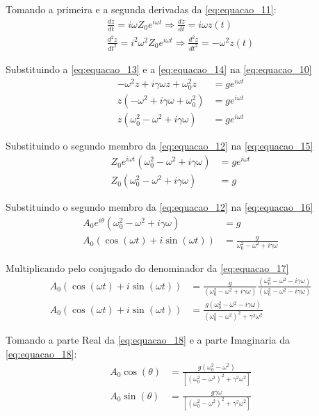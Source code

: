\documentclass[12pt]{article}
\begin{document}
		Tomando a primeira e a segunda derivadas da \autoref{eq:equacao_11}:
		\begin{align}
			\frac{dz}{dt} = i\omega Z_0e^{i\omega t} \Longrightarrow \frac{dz}{dt} = i\omega z(t) \label{eq:equacao_13} \\
			\frac{d^2z}{dt^2} = i^2\omega^2 Z_0e^{i\omega t} \Longrightarrow \frac{d^2z}{dt^2} = -\omega^2 z(t) \label{eq:equacao_14}
		\end{align}
		
		Substituindo a \autoref{eq:equacao_13} e a \autoref{eq:equacao_14} na \autoref{eq:equacao_10}
		\begin{align}
			-\omega^2z + i\gamma \omega z + \omega_0^2 z &= ge^{i\omega t} \nonumber \\
			z(-\omega^2 + i\gamma \omega + \omega_0^2) &= ge^{i\omega t} \nonumber \\
			z(\omega_0^2-\omega^2 + i\gamma \omega) &= ge^{i\omega t} \label{eq:equacao_15}
		\end{align}
		
		Substituindo o segundo membro da \autoref{eq:equacao_12} na \autoref{eq:equacao_15}
		\begin{align}
			Z_0e^{i\omega t}(\omega_0^2-\omega^2 + i\gamma \omega) &= ge^{i\omega t} \nonumber \\
			Z_0(\omega_0^2-\omega^2 + i\gamma \omega) &= g \label{eq:equacao_16}
		\end{align}
		
		Substituindo o segundo membro da \autoref{eq:equacao_12} na \autoref{eq:equacao_16}		
		\begin{align}
			A_0e^{i\theta}(\omega_0^2-\omega^2 + i\gamma \omega) &= g \nonumber \\
			A_0(\cos(\omega t)+i\sin(\omega t)) &= \frac{g}{\omega_0^2-\omega^2 + i\gamma \omega} \label{eq:equacao_17}
		\end{align}
		
		Multiplicando pelo conjugado do denominador da \autoref{eq:equacao_17}
		\begin{align}
			A_0(\cos(\omega t)+i\sin(\omega t)) &= \frac{g}{(\omega_0^2-\omega^2 + i\gamma \omega)} \frac{(\omega_0^2-\omega^2 - i\gamma \omega)}{(\omega_0^2-\omega^2 - i\gamma \omega)} \nonumber \\
			A_0(\cos(\omega t)+i\sin(\omega t)) &= \frac{g(\omega_0^2-\omega^2 - i\gamma \omega)}{(\omega_0^2-\omega^2)^2+\gamma^2 \omega^2} \label{eq:equacao_18}
		\end{align}
		
		Tomando a parte Real da \autoref{eq:equacao_18} e a parte Imaginaria da \autoref{eq:equacao_18}:
		\begin{align}
			A_0\cos(\theta) &= \frac{g(\omega_0^2-\omega^2)}{[(\omega_0^2-\omega^2)^2+\gamma^2 \omega^2]}  \label{eq:equacao_19}\\
			A_0\sin(\theta) &= \frac{g\gamma \omega}{[(\omega_0^2-\omega^2)^2+\gamma^2 \omega^2]} \label{eq:equacao_20}
		\end{align}
		
\end{document}
